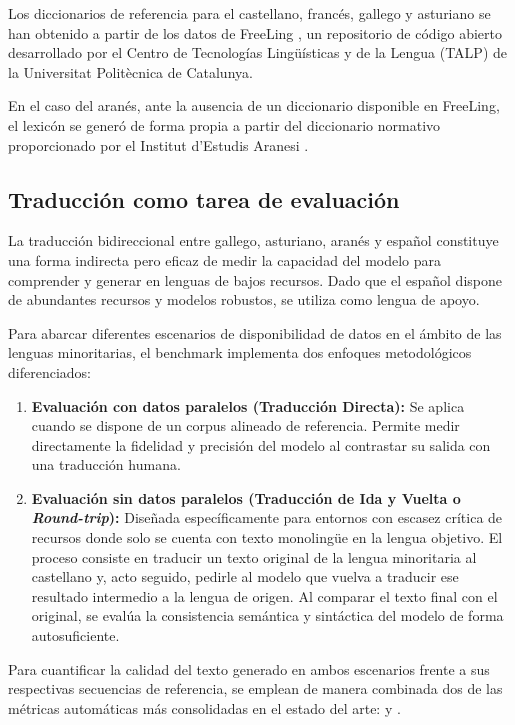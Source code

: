 Los diccionarios de referencia para el castellano, francés, gallego y asturiano se han obtenido a partir de los datos de FreeLing \cite{padro12}, un repositorio de código abierto desarrollado por el Centro de Tecnologías Lingüísticas y de la Lengua (TALP) de la Universitat Politècnica de Catalunya. 

En el caso del aranés, ante la ausencia de un diccionario disponible en FreeLing, el lexicón se generó de forma propia a partir del diccionario normativo proporcionado por el Institut d'Estudis Aranesi \cite{InstitutEstudisAranesi2014}.

\subsection{Traducción como tarea de evaluación}
\label{traduccion-evaluacion}

La traducción bidireccional entre gallego, asturiano, aranés y español constituye una forma indirecta pero eficaz de medir la capacidad del modelo para comprender y generar en lenguas de bajos recursos. Dado que el español dispone de abundantes recursos y modelos robustos, se utiliza como lengua de apoyo.

Para abarcar diferentes escenarios de disponibilidad de datos en el ámbito de las lenguas minoritarias, el benchmark implementa dos enfoques metodológicos diferenciados:

\begin{enumerate}
    \item \textbf{Evaluación con datos paralelos (Traducción Directa):} Se aplica cuando se dispone de un corpus alineado de referencia. Permite medir directamente la fidelidad y precisión del modelo al contrastar su salida con una traducción humana.
    \item \textbf{Evaluación sin datos paralelos (Traducción de Ida y Vuelta o \emph{Round-trip}):} Diseñada específicamente para entornos con escasez crítica de recursos donde solo se cuenta con texto monolingüe en la lengua objetivo. El proceso consiste en traducir un texto original de la lengua minoritaria al castellano y, acto seguido, pedirle al modelo que vuelva a traducir ese resultado intermedio a la lengua de origen. Al comparar el texto final con el original, se evalúa la consistencia semántica y sintáctica del modelo de forma autosuficiente.
\end{enumerate}

Para cuantificar la calidad del texto generado en ambos escenarios frente a sus respectivas secuencias de referencia, se emplean de manera combinada dos de las métricas automáticas más consolidadas en el estado del arte:  y .

